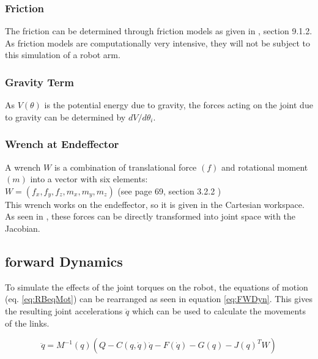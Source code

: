 \subsubsection{Friction }
The friction can be determined through friction models as given in  \cite{CorkeRoboticVisionControl}, section 9.1.2.
As friction models are computationally very intensive, they will not be subject to this simulation of a robot arm.

\subsubsection{Gravity Term}
As  $V (\theta)$ is the potential energy due to gravity, the forces acting on the joint due to gravity can be determined by $dV/d\theta_i$. %

\subsubsection{Wrench at Endeffector }
A wrench $W$ is a combination of translational force $(f)$ and rotational moment $(m)$ into a vector with six elements:\\
$ W = (f_x, f_y, f_z, m_x, m_y, m_z)$ (see \cite{CorkeRoboticVisionControl} page 69, section 3.2.2 )\\
This wrench works on the endeffector, so it is given in the Cartesian workspace.
As seen in , these forces can be directly transformed into joint space with the Jacobian.









\subsection{forward Dynamics}
To simulate the effects of the joint torques on the robot, the equations of motion (eq. \ref{eq:RBeqMot}) can be rearranged as seen in equation \ref{eq:FWDyn}. This gives the resulting joint accelerations $\ddot{q}$ which can be used to calculate the movements of the links.

\begin{equation} \label{eq:FWDyn}
	\ddot{q}= M^{-1}(q) (Q-C(q,\dot{q})\dot{q} - F(\dot{q}) -G(q) -J(q)^T W)
\end{equation}

